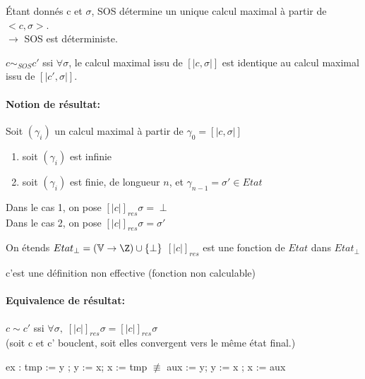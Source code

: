 \documentclass[10pt,a4paper]{article}
\newcommand{\sem}[1]{$\left[| #1 | \right]$}
\newcommand{\semm}[1]{\left[| #1 | \right]}
\newcommand{\V}{\mathbb{V}}
\begin{document}
\begin{thm}Étant donnés c et $\sigma$, SOS détermine un unique calcul maximal à partir de $<c, \sigma >$.\\
 $\rightarrow$ SOS est déterministe.\\
 \end{thm}
 
 \begin{definition}[Equivalence]
 $ c \sim_{SOS} c'$ ssi $\forall \sigma$, le calcul maximal issu de \sem{c , \sigma} est  identique au calcul maximal issu de \sem{c', \sigma}.
 \end{definition}
 


\paragraph*{Notion de résultat:}
\begin{thm} Soit $(\gamma_i)$ un calcul maximal à partir de $\gamma_0 = \semm{c, \sigma }$
\begin{enumerate}
\item soit $(\gamma_i)$ est infinie
\item soit $(\gamma_i )$ est finie, de longueur $n$, et $\gamma_{n-1} = \sigma' \in Etat$
\end{enumerate}
Dans le cas 1, on pose $\semm{ c }_{res} \sigma = \perp$\\
Dans le cas 2, on pose $\semm{ c }_{res} \sigma  = \sigma'$\\
\end{thm}


On étends $Etat_{\perp} = (\V \rightarrow \Z) \cup \{ \perp \}$
$\semm{ c }_{res}$ est une fonction de $Etat$ dans $Etat_{\perp}$
\begin{rem} c'est une définition non effective (fonction non calculable)
\end{rem}


\paragraph{Equivalence de résultat:}
\begin{definition} $c \sim c'$ ssi $\forall \sigma, \; \semm{ c }_{res} \sigma = \semm{ c }_{res} \sigma$\\
(soit c et c' bouclent, soit elles convergent vers le même état final.)
\end{definition}

ex : tmp := y ; y := x; x := tmp $\not \equiv$ aux := y; y := x ; x := aux
\end{document}
